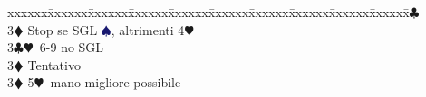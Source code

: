 \documentclass[a4paper,italian]{article}
\newcommand{\BC}{\textcolor{OliveGreen}{$\clubsuit$}}
\newcommand{\BD}{\textcolor{RedOrange}{$\vardiamondsuit$}}
\newcommand{\BH}{\textcolor{Red2}{$\varheartsuit${}}}
\newcommand{\BS}{\textcolor{MidnightBlue}{$\spadesuit${}}}
\newenvironment{bidtable}
{\begin{tabbing}

    xxxxxx\=xxxxxx\=xxxxxx\=xxxxxx\=xxxxxx\=xxxxxx\=xxxxxx\=xxxxxx\=xxxxxx\=xxxxxx\=\kill}
{\end{tabbing} }%
\begin{document}
\begin{multicols}{2}
\begin{bidtable}
                                            3\BC \> \textregistered\\
                                            3\BD \> Stop se SGL \BS, altrimenti 4\BH\-\\
                                            3\BC {}\BH\ 6-9 no SGL\+\\
                                            3\BD \> Tentativo \-\\
                                            3\BD {}-5\BH\ mano migliore possibile\\
                                        \end{bidtable}
                                        \bigbreak



                                    \end{multicols}
                                    \pagebreak
\end{document}
